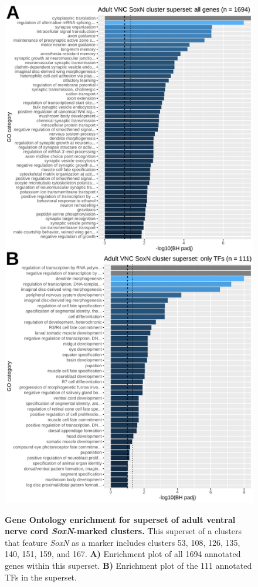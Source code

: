 \documentclass[withindex,glossary]{cam-thesis}
\begin{document}
\setcounter{figure}{22-1}
\begin{figure}[htbp]
\centering
\includegraphics[height=\dimexpr\textheight-68pt\relax,keepaspectratio]{figs/Fig22 allen SoxN_clusterSuperset.pdf}
\label{fig22}
\caption{\textbf{Gene Ontology enrichment for superset of adult ventral nerve cord \emph{SoxN}-marked clusters.} This superset of a clusters that feature \emph{SoxN} as a marker includes clusters 53, 108, 126, 135, 140, 151, 159, and 167. \textbf{A)} Enrichment plot of all 1694 annotated genes within this superset. \textbf{B)} Enrichment plot of the 111 annotated TFs in the superset.}
\end{figure}
\end{document}
